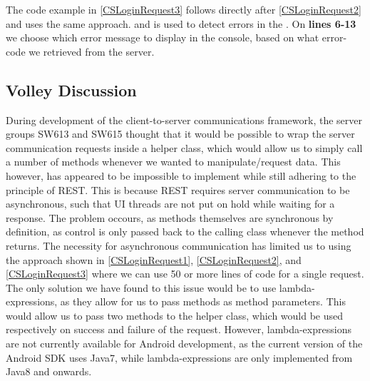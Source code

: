 The code example in \autoref{CSLoginRequest3} follows directly after
\autoref{CSLoginRequest2} and uses the same approach. and is used to detect
errors in the . On \textbf{lines 6-13} we choose which error
message to display in the console, based on what error-code we retrieved from
the server.

\subsection{Volley Discussion}
During development of the client-to-server communications framework, the server
groups SW613 and SW615 thought that it would be possible to wrap the server
communication requests inside a helper class, which would allow us to simply
call a number of methods whenever we wanted to manipulate/request data. This
however, has appeared to be impossible to implement while still adhering to the
principle of REST. This is because REST requires server communication to be
asynchronous, such that UI threads are not put on hold while waiting for a
response. The problem occours, as methods themselves are synchronous by
definition, as control is only passed back to the calling class whenever the
method returns. The necessity for asynchronous communication has limited us to
using the approach shown in \autoref{CSLoginRequest1}, \autoref{CSLoginRequest2}, and
\autoref{CSLoginRequest3} where we can use 50 or more lines of code for a
single request. The only solution we have found to this issue would be to use
lambda-expressions, as they allow for us to pass methods as method parameters.
This would allow us to pass two methods to the helper class, which would be used
respectively on success and failure of the request. However, lambda-expressions
are not currently available for Android development, as the current version of
the Android SDK uses Java7, while lambda-expressions are only implemented from
Java8 and onwards.













